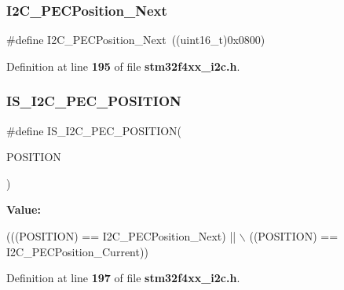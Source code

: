 \subsubsection{I2\+C\+\_\+\+P\+E\+C\+Position\+\_\+\+Next}
{\footnotesize\ttfamily \#define I2\+C\+\_\+\+P\+E\+C\+Position\+\_\+\+Next~((uint16\+\_\+t)0x0800)}



Definition at line \textbf{ 195} of file \textbf{ stm32f4xx\+\_\+i2c.\+h}.

\mbox{\label{group__I2C__PEC__position_gac8611a62b06256b1b3c60d4859a016ef}} 
\subsubsection{I\+S\+\_\+\+I2\+C\+\_\+\+P\+E\+C\+\_\+\+P\+O\+S\+I\+T\+I\+ON}
{\footnotesize\ttfamily \#define I\+S\+\_\+\+I2\+C\+\_\+\+P\+E\+C\+\_\+\+P\+O\+S\+I\+T\+I\+ON(\begin{DoxyParamCaption}\item[{}]{P\+O\+S\+I\+T\+I\+ON }\end{DoxyParamCaption})}

{\bfseries Value\+:}
\begin{DoxyCode}
(((POSITION) == I2C_PECPosition_Next) || \(\backslash\)
                                       ((POSITION) == I2C_PECPosition_Current))
\end{DoxyCode}


Definition at line \textbf{ 197} of file \textbf{ stm32f4xx\+\_\+i2c.\+h}.

